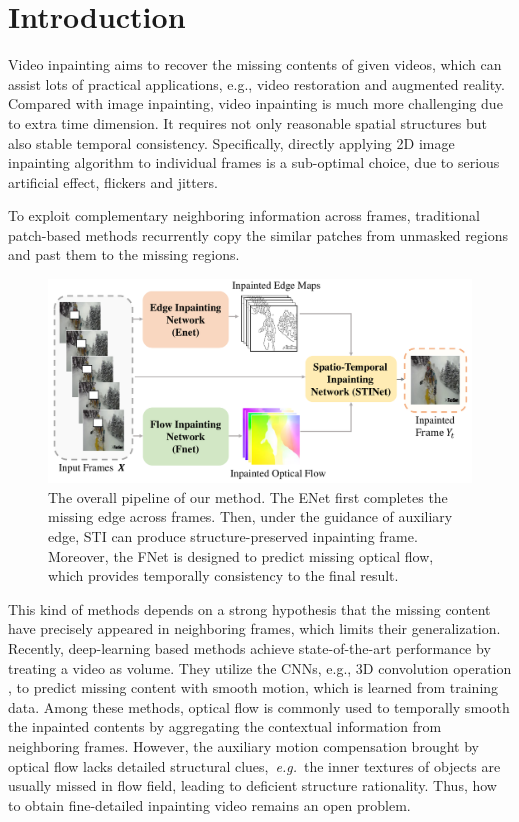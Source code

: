 \section{Introduction}
\noindent Video inpainting aims to recover the missing contents of given videos, which can assist lots of practical applications, e.g., video restoration and augmented reality. Compared with image inpainting, video inpainting is much more challenging due to extra time dimension. It requires not only reasonable spatial structures but also stable temporal consistency. Specifically, directly applying 2D image inpainting algorithm \cite{yu2018free,Xiong_2019_CVPR} to individual frames is a sub-optimal choice, due to serious artificial effect, flickers and jitters. 

To exploit complementary neighboring information across frames, traditional patch-based methods \cite{patwardhan2007video,wexler2004space,newson2014video} recurrently copy the similar patches from unmasked regions and past them to the missing regions. 
\begin{figure}[t]
	\centering
	\includegraphics[width=1.0\columnwidth]{zong} %
	\caption{The overall pipeline of our method. The ENet first completes the missing edge across frames. Then, under the guidance of auxiliary edge, STI can produce structure-preserved inpainting frame. Moreover, the FNet is designed to predict missing optical flow, which provides temporally consistency to the final result.}
	\label{zong}
\end{figure}
This kind of methods depends on a strong hypothesis that the missing content have precisely appeared in neighboring frames, which limits their generalization.
Recently, deep-learning based methods achieve state-of-the-art performance by treating a video as volume.
They utilize the CNNs, e.g., 3D convolution operation \cite{wang2019video}, to predict missing content with smooth motion, which is learned from training data.
Among these methods, optical flow is commonly used to temporally smooth the inpainted contents \cite{Xu_2019_CVPR,Kim_2019_CVPR,Kim_2019_CVPR1} by aggregating the contextual information from neighboring frames.
However, the auxiliary motion compensation brought by optical flow lacks detailed structural clues,~\emph{e.g.}~the inner textures of objects are usually missed in flow field, leading to deficient structure rationality.
Thus, how to obtain fine-detailed inpainting video remains an open problem.





